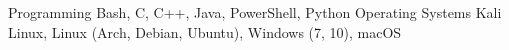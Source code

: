 

\begin{cvskills}

  \cvskill
    {Programming} %
    {Bash, C, C++, Java, PowerShell, Python} %
  \cvskill
    {Operating Systems} %
    {Kali Linux, Linux (Arch, Debian, Ubuntu), Windows (7, 10), macOS} %

\end{cvskills}
